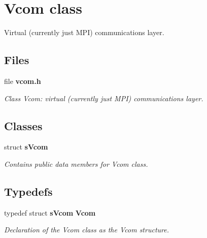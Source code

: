 \section{Vcom class}
\label{a00024}


Virtual (currently just M\-P\-I) communications layer.  


\subsection*{Files}
\begin{DoxyCompactItemize}
\item 
file {\bf vcom.\-h}
\begin{DoxyCompactList}\small\item\em Class Vcom\-: virtual (currently just M\-P\-I) communications layer. \end{DoxyCompactList}\end{DoxyCompactItemize}
\subsection*{Classes}
\begin{DoxyCompactItemize}
\item 
struct {\bf s\-Vcom}
\begin{DoxyCompactList}\small\item\em Contains public data members for Vcom class. \end{DoxyCompactList}\end{DoxyCompactItemize}
\subsection*{Typedefs}
\begin{DoxyCompactItemize}
\item 
typedef struct {\bf s\-Vcom} {\bf Vcom}
\begin{DoxyCompactList}\small\item\em Declaration of the Vcom class as the Vcom structure. \end{DoxyCompactList}\end{DoxyCompactItemize}
